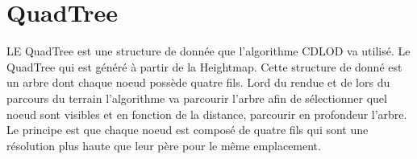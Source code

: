 \documentclass[12pt]{report}
\begin{document}
  
  \section{QuadTree}
  
  LE QuadTree est une structure de donnée que l'algorithme CDLOD va utilisé. Le QuadTree qui est généré à partir de la Heightmap. 
  Cette structure de donné est un arbre dont chaque noeud possède quatre fils. Lord du rendue et de lors du parcours du terrain 
  l'algorithme va parcourir l'arbre afin de sélectionner quel noeud sont visibles et en fonction de la distance, parcourir en profondeur l'arbre.
   Le principe est que chaque noeud est composé de quatre fils qui sont une résolution plus haute que leur père pour le même emplacement.
  
  
  
  
  
  
  
  
  
  
\end{document}
